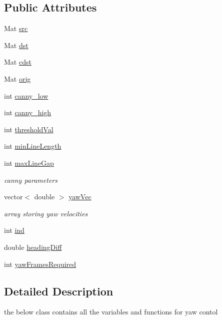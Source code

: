 \subsection*{Public Attributes}
\begin{DoxyCompactItemize}
\item 
Mat \hyperlink{classYawControl_a02a206520541343b1a0eab7c6129acc3}{src}
\item 
Mat \hyperlink{classYawControl_a9dedb68654ae5b07758beec3d645f05a}{dst}
\item 
Mat \hyperlink{classYawControl_a62d073dfc31c5f61b27be6df0f5abddb}{cdst}
\item 
Mat \hyperlink{classYawControl_a462e793d0950d099f9744d72559f9471}{orig}
\item 
int \hyperlink{classYawControl_a9c557900aff8a6f181d68183cf9bfba5}{canny\+\_\+low}
\item 
int \hyperlink{classYawControl_a4f6410248feef55d86d7bab763efcaf6}{canny\+\_\+high}
\item 
int \hyperlink{classYawControl_aac657b91e9b950cf4087cbe045fc10e3}{threshold\+Val}
\item 
int \hyperlink{classYawControl_aadacf29274314cf444cdea2d900cba80}{min\+Line\+Length}
\item 
int \hyperlink{classYawControl_a652fc817420f9da0954685ae07bee080}{max\+Line\+Gap}
\begin{DoxyCompactList}\small\item\em canny parameters \end{DoxyCompactList}\item 
vector$<$ double $>$ \hyperlink{classYawControl_a1bbb4b2ad414fc1e5a2edbde811bd7fe}{yaw\+Vec}
\begin{DoxyCompactList}\small\item\em array storing yaw velocities \end{DoxyCompactList}\item 
int \hyperlink{classYawControl_a4d90209ac153c8b12df97fe326fa696f}{ind}
\item 
double \hyperlink{classYawControl_a084d1ee8b6e510f2d398577518981589}{heading\+Diff}
\item 
int \hyperlink{classYawControl_a52fc55d1751f266d7cffb7001942a012}{yaw\+Frames\+Required}
\end{DoxyCompactItemize}


\subsection{Detailed Description}
the below class contains all the variables and functions for yaw contol 

